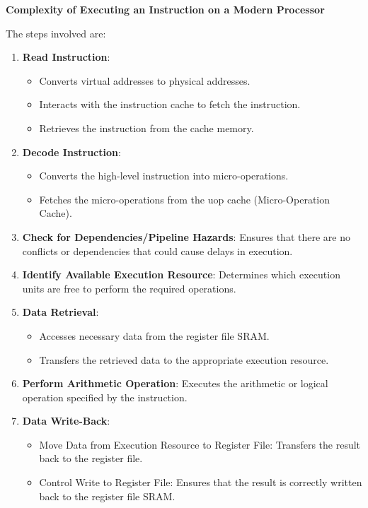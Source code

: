 \highspace
\begin{flushleft}
    \textcolor{Green3}{ \textbf{Complexity of Executing an Instruction on a Modern Processor}}
\end{flushleft}
The steps involved are:
\begin{enumerate}
    \item \textbf{Read Instruction}:
    \begin{itemize}
        \item Converts virtual addresses to physical addresses.
        \item Interacts with the instruction cache to fetch the instruction.
        \item Retrieves the instruction from the cache memory.
    \end{itemize}
 
    \item \textbf{Decode Instruction}:
    \begin{itemize}
        \item Converts the high-level instruction into micro-operations.
        \item Fetches the micro-operations from the uop cache (Micro-Operation Cache).
    \end{itemize}
 
    \item \textbf{Check for Dependencies/Pipeline Hazards}: Ensures that there are no conflicts or dependencies that could cause delays in execution.
 
    \item \textbf{Identify Available Execution Resource}: Determines which execution units are free to perform the required operations.
 
    \item \textbf{Data Retrieval}:
    \begin{itemize}
        \item Accesses necessary data from the register file SRAM.
        \item Transfers the retrieved data to the appropriate execution resource.
    \end{itemize}
 
    \item \textbf{Perform Arithmetic Operation}: Executes the arithmetic or logical operation specified by the instruction.
 
    \item \textbf{Data Write-Back}:
    \begin{itemize}
        \item Move Data from Execution Resource to Register File: Transfers the result back to the register file.
        \item Control Write to Register File: Ensures that the result is correctly written back to the register file SRAM.
    \end{itemize}
\end{enumerate}

